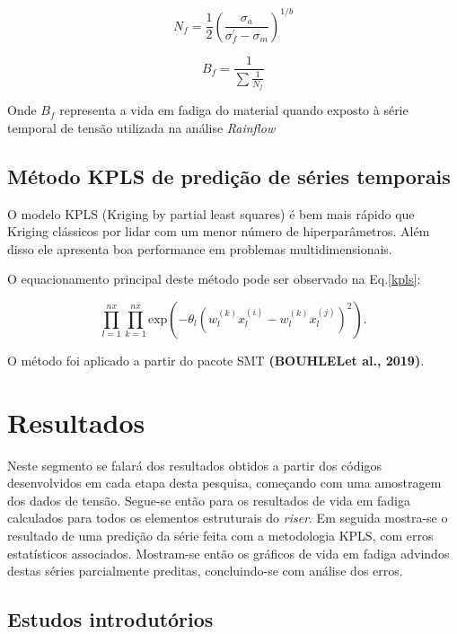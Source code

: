 \begin{equation}
    N_f = \frac{1}{2} \left( \frac{\sigma_a}{\sigma^\prime_f - \sigma_m } \right)^{1/b}
\end{equation}

\begin{equation}
    B_f = \frac{1}{\sum \frac{1}{N_f}}
\end{equation}

Onde $B_f$ representa a vida em fadiga do material quando exposto à série  temporal de tensão utilizada na análise \emph{Rainflow}

\subsection{Método KPLS de predição de séries temporais}

O modelo KPLS (Kriging by partial least squares) é bem mais rápido que Kriging clássicos por lidar com um menor número de hiperparâmetros. Além disso ele apresenta boa performance em problemas multidimensionais. 

O equacionamento principal deste método pode ser observado na Eq.\ref{kpls}:
    
\begin{equation}\label{kpls}
    \prod^{nx}_{l=1} \prod^{nx}_{k=1} \text{exp} \left( -\theta_l(w_l^{(k)} x_l^{(i)} - w_l^{(k)} x_l^{(j)} )^2\right).
\end{equation}

O método foi aplicado a partir do pacote SMT \textbf{(BOUHLELet al., 2019)}.

\section{Resultados}

Neste segmento se falará dos resultados obtidos a partir dos códigos desenvolvidos em cada etapa desta pesquisa, começando com uma amostragem dos dados de tensão. Segue-se então para os resultados de vida em fadiga calculados para todos os elementos estruturais do \emph{riser}. Em seguida mostra-se o resultado de uma predição da série feita com a metodologia KPLS, com erros estatísticos associados. Mostram-se então os gráficos de vida em fadiga advindos destas séries parcialmente preditas, concluindo-se com análise dos erros.

\subsection{Estudos introdutórios}

